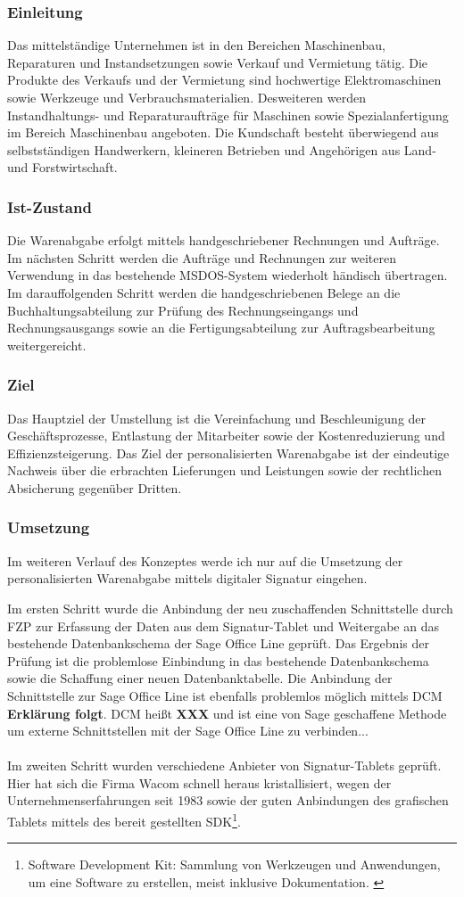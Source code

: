 \subsubsection*{Einleitung}
Das mittelständige Unternehmen ist in den Bereichen Maschinenbau, Reparaturen und Instandsetzungen sowie Verkauf und Vermietung tätig. Die Produkte des Verkaufs und der Vermietung sind hochwertige Elektromaschinen sowie Werkzeuge und Verbrauchsmaterialien. Desweiteren werden Instandhaltungs- und Reparaturaufträge für Maschinen sowie Spezialanfertigung im Bereich Maschinenbau angeboten. Die Kundschaft besteht überwiegend aus selbstständigen Handwerkern, kleineren Betrieben und Angehörigen aus Land- und Forstwirtschaft.
\subsubsection*{Ist-Zustand}
Die Warenabgabe erfolgt mittels handgeschriebener Rechnungen und Aufträge. Im nächsten Schritt werden die Aufträge und Rechnungen zur weiteren Verwendung in das bestehende MSDOS-System wiederholt händisch übertragen. Im darauffolgenden Schritt werden die handgeschriebenen Belege an die Buchhaltungsabteilung zur Prüfung des Rechnungseingangs und Rechnungsausgangs sowie an die Fertigungsabteilung zur Auftragsbearbeitung weitergereicht.
\subsubsection*{Ziel}
Das Hauptziel der Umstellung ist die Vereinfachung und Beschleunigung der Geschäftsprozesse, Entlastung der Mitarbeiter sowie der Kostenreduzierung und Effizienzsteigerung. Das Ziel der personalisierten Warenabgabe ist der eindeutige Nachweis über die erbrachten Lieferungen und Leistungen sowie der rechtlichen Absicherung gegenüber Dritten. \cite{einleitung1}
\subsubsection*{Umsetzung}
Im weiteren Verlauf des Konzeptes werde ich nur auf die Umsetzung der personalisierten Warenabgabe mittels digitaler Signatur eingehen. 

Im ersten Schritt wurde die Anbindung der neu zuschaffenden Schnittstelle durch FZP zur Erfassung der Daten aus dem Signatur-Tablet und Weitergabe an das bestehende Datenbankschema der Sage Office Line geprüft. Das Ergebnis der Prüfung ist die problemlose Einbindung in das bestehende Datenbankschema sowie die Schaffung einer neuen Datenbanktabelle. Die Anbindung der Schnittstelle zur Sage Office Line ist ebenfalls problemlos möglich mittels DCM \textbf{Erklärung folgt}. DCM heißt \textbf{XXX} und ist eine von Sage geschaffene Methode um externe Schnittstellen mit der Sage Office Line zu verbinden...\\\\
Im zweiten Schritt wurden verschiedene Anbieter von Signatur-Tablets geprüft. Hier hat sich die Firma Wacom schnell heraus kristallisiert, wegen der Unternehmenserfahrungen seit 1983 sowie der guten Anbindungen des grafischen Tablets mittels des bereit gestellten SDK\footnote{\label{foot:4} Software Development Kit: Sammlung von Werkzeugen und Anwendungen, um eine Software zu erstellen, meist inklusive Dokumentation. \cite{SDK}}. \cite{konzept1}